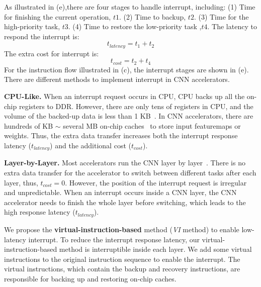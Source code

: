 As illustrated in (e),there are four stages to handle interrupt, including: (1) Time for finishing the current operation, $t1$. (2) Time to backup, $t2$. (3) Time for the high-priority task, $t3$. (4) Time to restore the low-priority task ,$t4$. 
The latency to respond the interrupt is:
\begin{equation}
	t_{latency} = t_1+t_2
	\label{equ:latency}
\end{equation}
The extra cost for interrupt is: 
\begin{equation}
	t_{cost}=t_2+t_4
	\label{equ:cost}
\end{equation}	
For the instruction flow illustrated in (c), the interrupt stages are shown in (e).
There are different methods to implement interrupt in CNN accelerators.

\textbf{CPU-Like.}
When an interrupt request occurs in CPU, CPU backs up all the on-chip registers to DDR. However, there are only tens of registers in CPU, and the volume of the backed-up data is less than 1 KB~\cite{furber2000arm}. In CNN accelerators, there are hundreds of KB $\sim$ several MB on-chip caches~\cite{qiu2016going, guo2017angel} to store input featuremaps or weights. 
Thus, the extra data transfer increases both the interrupt response latency ($t_{latency}$) and the additional cost ($t_{cost}$).

\textbf{Layer-by-Layer.}
Most accelerators run the CNN layer by layer~\cite{qiu2016going,guo2017angel}. 
There is no extra data transfer for the accelerator to switch between different tasks after each layer, thus, $t_{cost}=0$. 
However, the position of the interrupt request is irregular and unpredictable. When an interrupt occurs inside a CNN layer, the CNN accelerator needs to finish the whole layer before switching, which leads to the high response latency ($t_{latency}$).




We propose the \textbf{virtual-instruction-based} method (\textit{VI} method) to enable low-latency interrupt. 
To reduce the interrupt response latency, our virtual-instruction-based method is interruptible inside each layer. We add some virtual instructions to the original instruction sequence to enable the interrupt.
The virtual instructions, which contain the backup and recovery instructions, are responsible for backing up and restoring on-chip caches. 

